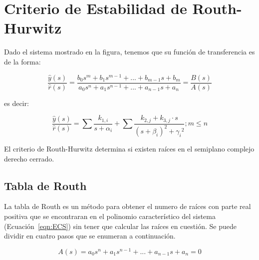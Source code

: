 
\chapter{Criterio de Estabilidad de Routh-Hurwitz}


    Dado el sistema mostrado en la figura, tenemos que su función de transferencia es de la forma:

    \begin{equation}
        \frac{\hat{y}(s)}{\hat{r}(s)} = \frac{b_0 s^m + b_1 s^{m-1} + ... + b_{m-1} s + b_m}{a_0 s^n + a_1 s^{n-1} + ... + a_{n-1} s + a_n} = \frac{B(s)}{A(s)}
    \end{equation}

    es decir:

    \begin{equation}
        \frac{\hat{y}(s)}{\hat{r}(s)} = \sum{\frac{k_{1,i}}{s + \alpha_i}} + \sum{\frac{k_{2,j} + k_{3,j} \cdot s}{(s + \beta_i)^2 + {\gamma_i}^2}} ; m \leq n
    \end{equation}

    El criterio de Routh-Hurwitz determina si existen raíces en el semiplano complejo derecho cerrado.


    \newpage
    \section{Tabla de Routh}
        La tabla de Routh es un método para obtener el numero de raíces con parte real positiva que se encontraran en el polinomio característico del sistema (Ecuación~\ref{eqn:ECS}) sin tener que calcular las raíces en cuestión. Se puede dividir en cuatro pasos que se enumeran a continuación.

        \begin{equation} \label{eqn:ECS}
            A(s) = a_0 s^n + a_1 s^{n-1} + ... + a_{n-1} s + a_n = 0
        \end{equation}

